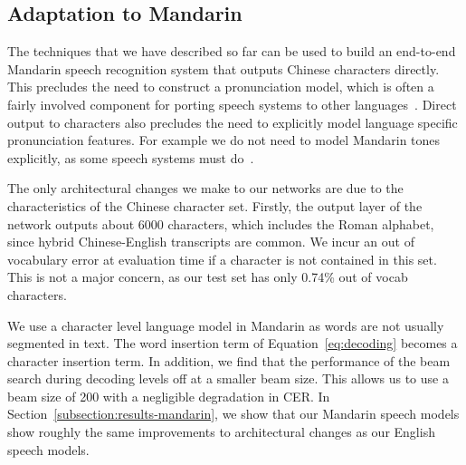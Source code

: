 \subsection{Adaptation to Mandarin}
\label{sec:scaling_asr:chinesemodel}

The techniques that we have described so far can be used to build an end-to-end
Mandarin speech recognition system that outputs Chinese characters directly.
This precludes the need to construct a pronunciation model, which is often a
fairly involved component for porting speech systems to other
languages~\cite{shan2010}. Direct output to characters also precludes the need
to explicitly model language specific pronunciation features. For example we do
not need to model Mandarin tones explicitly, as some speech systems must
do~\cite{shan2010, niu2013}.

The only architectural changes we make to our networks are due to the
characteristics of the Chinese character set. Firstly, the output layer of the
network outputs about 6000 characters, which includes the Roman alphabet, since
hybrid Chinese-English transcripts are common. We incur an out of vocabulary
error at evaluation time if a character is not contained in this set. This is
not a major concern, as our test set has only 0.74\% out of vocab characters.

We use a character level language model in Mandarin as words are not usually
segmented in text. The word insertion term of Equation~\ref{eq:decoding}
becomes a character insertion term. In addition, we find that the performance
of the beam search during decoding levels off at a smaller beam size. This
allows us to use a beam size of 200 with a negligible degradation in CER. In
Section~\ref{subsection:results-mandarin}, we show that our Mandarin speech
models show roughly the same improvements to architectural changes as our
English speech models.
